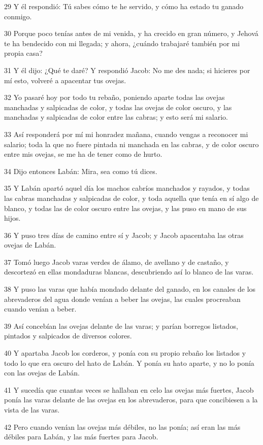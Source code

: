 29 Y él respondió: Tú sabes cómo te he servido, y cómo ha estado tu ganado conmigo.

30 Porque poco tenías antes de mi venida, y ha crecido en gran número, y Jehová te ha bendecido con mi llegada; y ahora, ¿cuándo trabajaré también por mi propia casa?

31 Y él dijo: ¿Qué te daré? Y respondió Jacob: No me des nada; si hicieres por mí esto, volveré a apacentar tus ovejas.

32 Yo pasaré hoy por todo tu rebaño, poniendo aparte todas las ovejas manchadas y salpicadas de color, y todas las ovejas de color oscuro, y las manchadas y salpicadas de color entre las cabras; y esto será mi salario.

33 Así responderá por mí mi honradez mañana, cuando vengas a reconocer mi salario; toda la que no fuere pintada ni manchada en las cabras, y de color oscuro entre mis ovejas, se me ha de tener como de hurto.

34 Dijo entonces Labán: Mira, sea como tú dices.

35 Y Labán apartó aquel día los machos cabríos manchados y rayados, y todas las cabras manchadas y salpicadas de color, y toda aquella que tenía en sí algo de blanco, y todas las de color oscuro entre las ovejas, y las puso en mano de sus hijos.

36 Y puso tres días de camino entre sí y Jacob; y Jacob apacentaba las otras ovejas de Labán.

37 Tomó luego Jacob varas verdes de álamo, de avellano y de castaño, y descortezó en ellas mondaduras blancas, descubriendo así lo blanco de las varas.

38 Y puso las varas que había mondado delante del ganado, en los canales de los abrevaderos del agua donde venían a beber las ovejas, las cuales procreaban cuando venían a beber.

39 Así concebían las ovejas delante de las varas; y parían borregos listados, pintados y salpicados de diversos colores.

40 Y apartaba Jacob los corderos, y ponía con su propio rebaño los listados y todo lo que era oscuro del hato de Labán. Y ponía su hato aparte, y no lo ponía con las ovejas de Labán.

41 Y sucedía que cuantas veces se hallaban en celo las ovejas más fuertes, Jacob ponía las varas delante de las ovejas en los abrevaderos, para que concibiesen a la vista de las varas.

42 Pero cuando venían las ovejas más débiles, no las ponía; así eran las más débiles para Labán, y las más fuertes para Jacob.

